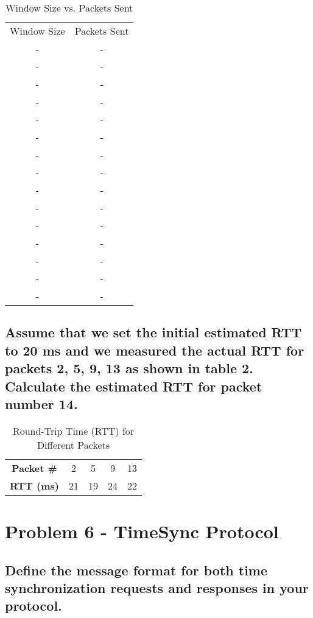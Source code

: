 \documentclass{article}
\begin{document}
	\begin{table}[h]
		\centering
		\begin{tabular}{cc}
			Window Size & Packets Sent \\
			- & - \\
			- & - \\
			- & - \\
			- & - \\
			- & - \\
			- & - \\
			- & - \\
			- & - \\
			- & - \\
			- & - \\
			- & - \\
			- & - \\
			- & - \\
			- & - \\
			- & - \\
		\end{tabular}
		\caption{Window Size vs. Packets Sent}
		\label{tab:window_packets}
	\end{table}

\subsection{Assume that we set the initial estimated RTT to 20 ms and we measured the
actual RTT for packets 2, 5, 9, 13 as shown in table 2. Calculate the estimated RTT for
packet number 14.}

	\begin{table}[h]
		\centering
		\begin{tabular}{ccccc}
			\textbf{Packet \#} & 2  & 5  & 9  & 13 \\
			\textbf{RTT (ms)}  & 21 & 19 & 24 & 22 \\
		\end{tabular}
		\caption{Round-Trip Time (RTT) for Different Packets}
		\label{tab:rtt_data}
	\end{table}

\section{Problem 6 - TimeSync Protocol}

\subsection{Define the message format for both time synchronization requests and responses
in your protocol.}
\end{document}
